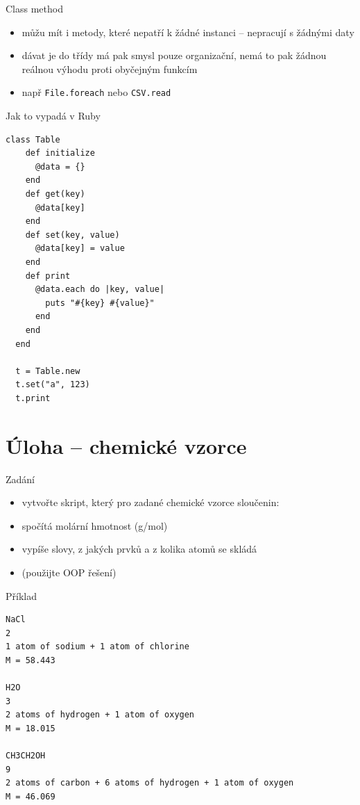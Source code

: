 \documentclass{beamer}
\begin{document}
\begin{frame}{Class method}
  \begin{itemize}
    \item můžu mít i metody, které nepatří k žádné instanci – nepracují s žádnými daty
    \item dávat je do třídy má pak smysl pouze organizační, nemá to pak žádnou reálnou výhodu proti obyčejným funkcím
    \item např \texttt{File.foreach} nebo \texttt{CSV.read}
  \end{itemize}
\end{frame}

\begin{frame}[containsverbatim]{Jak to vypadá v Ruby}
  \begin{Verbatim}[fontsize=\tiny]
  class Table
    def initialize
      @data = {}
    end
    def get(key)
      @data[key]
    end
    def set(key, value)
      @data[key] = value
    end
    def print
      @data.each do |key, value|
        puts "#{key} #{value}"
      end
    end
  end

  t = Table.new
  t.set("a", 123)
  t.print
  \end{Verbatim}
\end{frame}

\section{Úloha – chemické vzorce}

\begin{frame}{Zadání}
  \begin{itemize}
    \item vytvořte skript, který pro zadané chemické vzorce sloučenin:
    \item spočítá molární hmotnost (g/mol)
    \item vypíše slovy, z jakých prvků a z kolika atomů se skládá
    \item (použijte OOP řešení)
  \end{itemize}
\end{frame}

\begin{frame}[fragile]{Příklad}
  \begin{Verbatim}[fontsize=\small]
NaCl
2
1 atom of sodium + 1 atom of chlorine
M = 58.443

H2O
3
2 atoms of hydrogen + 1 atom of oxygen
M = 18.015

CH3CH2OH
9
2 atoms of carbon + 6 atoms of hydrogen + 1 atom of oxygen
M = 46.069
  \end{Verbatim}
\end{frame}
\end{document}
